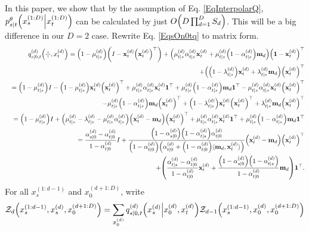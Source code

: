 \documentclass[10pt]{article}
\begin{document}
In this paper, we show that by the assumption of Eq. \eqref{EqInterpolarQ}, $p^\theta_{s|t}\qty(x_s^{(1:D)}\middle|x_t^{(1:D)})$ can be calculated by just $O\qty(D\prod_{d=1}^D S_d)$. This will be a big difference in our $D=2$ case. Rewrite Eq. \eqref{EqsOn0tq} to matrix form.
\begin{eqnarray*}
  &&q^{(d)}_{s|0,t}\qty(\cdot|\cdot,x^{(d)}_t)=\qty(1-\mu^{(d)}_{t|s})\qty(I - \mathbf{x}^{(d)}_t\qty(\mathbf{x}^{(d)}_t)^\top) + \qty(\mu^{(d)}_{t|s}\alpha^{(d)}_{t|s}\mathbf{x}^{(d)}_t + \mu^{(d)}_{t|s}\qty(1-\alpha^{(d)}_{t|s})\mathbf{m}_d)\qty(\mathbf{1}-\mathbf{x}^{(d)}_t)^\top\\
  &&+ \qty(\qty(1-\lambda^{(d)}_{t|s})\mathbf{x}^{(d)}_t + \lambda^{(d)}_{t|s}\mathbf{m}_d)\qty(\mathbf{x}^{(d)}_t)^\top\\
  &&=\qty(1-\mu^{(d)}_{t|s}) I - \qty(1-\mu^{(d)}_{t|s})\mathbf{x}^{(d)}_t\qty(\mathbf{x}^{(d)}_t)^\top + \mu^{(d)}_{t|s}\alpha^{(d)}_{t|s}\mathbf{x}^{(d)}_t\mathbf{1}^\top + \mu^{(d)}_{t|s}\qty(1-\alpha^{(d)}_{t|s})\mathbf{m}_d\mathbf{1}^\top - \mu^{(d)}_{t|s}\alpha^{(d)}_{t|s}\mathbf{x}^{(d)}_t\qty(\mathbf{x}^{(d)}_t)^\top\\
  && - \mu^{(d)}_{t|s}\qty(1-\alpha^{(d)}_{t|s})\mathbf{m}_d\qty(\mathbf{x}^{(d)}_t)^\top + \qty(1-\lambda^{(d)}_{t|s})\mathbf{x}^{(d)}_t\qty(\mathbf{x}^{(d)}_t)^\top + \lambda^{(d)}_{t|s}\mathbf{m}_d\qty(\mathbf{x}^{(d)}_t)^\top\\
  &&=\qty(1-\mu^{(d)}_{t|s}) I + \qty(\mu^{(d)}_{t|s} - \lambda^{(d)}_{t|s} - \mu^{(d)}_{t|s}\alpha^{(d)}_{t|s})\qty(\mathbf{x}^{(d)}_t - \mathbf{m}_d)\qty(\mathbf{x}^{(d)}_t)^\top + \mu^{(d)}_{t|s}\alpha^{(d)}_{t|s}\mathbf{x}^{(d)}_t\mathbf{1}^\top + \mu^{(d)}_{t|s}\qty(1-\alpha^{(d)}_{t|s})\mathbf{m}_d\mathbf{1}^\top\\
  &&=\frac{\alpha^{(d)}_{s|0}-\alpha^{(d)}_{t|0}}{1-\alpha^{(d)}_{t|0}} I + \frac{\qty(1-\alpha^{(d)}_{s|0})\qty(1-\alpha^{(d)}_{t|s})\alpha^{(d)}_{t|0}}{\qty(1-\alpha^{(d)}_{t|0})\qty(\alpha^{(d)}_{t|0}+\qty(1-\alpha^{(d)}_{t|0})\langle\mathbf{m}_d, \mathbf{x}^{(d)}_t\rangle)}\qty(\mathbf{x}^{(d)}_t - \mathbf{m}_d)\qty(\mathbf{x}^{(d)}_t)^\top\\
  && + \qty(\frac{\alpha^{(d)}_{t|s}-\alpha^{(d)}_{t|0}}{1-\alpha^{(d)}_{t|0}}\mathbf{x}^{(d)}_t + \frac{\qty(1-\alpha^{(d)}_{s|0})\qty(1-\alpha^{(d)}_{t|s})}{1-\alpha^{(d)}_{t|0}}\mathbf{m}_d)\mathbf{1}^\top.
\end{eqnarray*}
For all $x_s^{(1:d-1)}$ and $x_0^{(d+1:D)}$, write
\begin{eqnarray*}
  \mathcal{Z}_d\qty(x^{(1:d-1)}_s, x^{(d)}_s, x^{(d+1:D)}_0)=\sum_{x^{(d)}_0}q_{s|0,t}^{(d)}\qty(x_s^{(d)}\middle|x_0^{(d)}, x_t^{(d)})\mathcal{Z}_{d-1}\qty(x_s^{(1:d-1)},x_0^{(d)},x_0^{(d+1:D)})
\end{eqnarray*}
\end{document}
